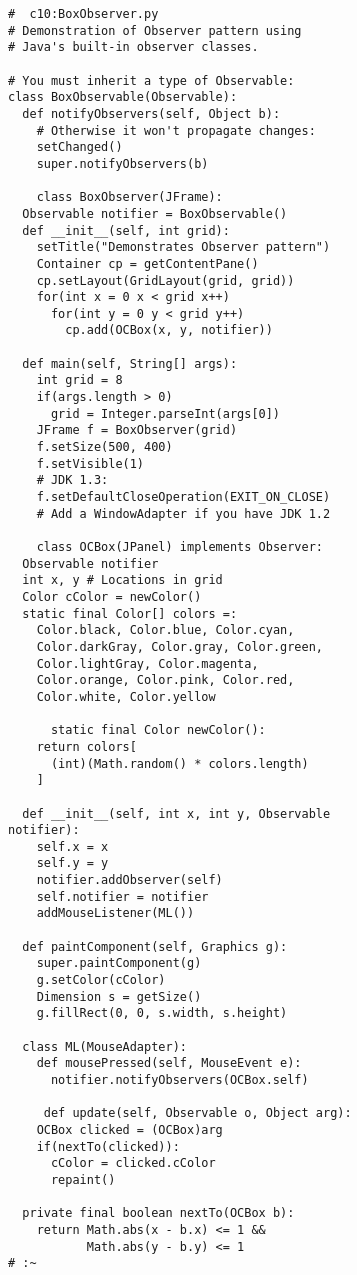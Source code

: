 \begin{lstlisting} 
#  c10:BoxObserver.py 
# Demonstration of Observer pattern using 
# Java's built-in observer classes. 

# You must inherit a type of Observable: 
class BoxObservable(Observable): 
  def notifyObservers(self, Object b): 
    # Otherwise it won't propagate changes: 
    setChanged() 
    super.notifyObservers(b) 
    
    class BoxObserver(JFrame): 
  Observable notifier = BoxObservable() 
  def __init__(self, int grid): 
    setTitle("Demonstrates Observer pattern") 
    Container cp = getContentPane() 
    cp.setLayout(GridLayout(grid, grid)) 
    for(int x = 0 x < grid x++) 
      for(int y = 0 y < grid y++) 
        cp.add(OCBox(x, y, notifier)) 
        
  def main(self, String[] args): 
    int grid = 8 
    if(args.length > 0) 
      grid = Integer.parseInt(args[0]) 
    JFrame f = BoxObserver(grid) 
    f.setSize(500, 400) 
    f.setVisible(1) 
    # JDK 1.3: 
    f.setDefaultCloseOperation(EXIT_ON_CLOSE) 
    # Add a WindowAdapter if you have JDK 1.2 
    
    class OCBox(JPanel) implements Observer: 
  Observable notifier 
  int x, y # Locations in grid 
  Color cColor = newColor() 
  static final Color[] colors =:  
    Color.black, Color.blue, Color.cyan,  
    Color.darkGray, Color.gray, Color.green, 
    Color.lightGray, Color.magenta,  
    Color.orange, Color.pink, Color.red,  
    Color.white, Color.yellow 
    
      static final Color newColor(): 
    return colors[ 
      (int)(Math.random() * colors.length) 
    ] 
    
  def __init__(self, int x, int y, Observable 
notifier): 
    self.x = x 
    self.y = y 
    notifier.addObserver(self) 
    self.notifier = notifier 
    addMouseListener(ML()) 
    
  def paintComponent(self, Graphics g): 
    super.paintComponent(g) 
    g.setColor(cColor) 
    Dimension s = getSize() 
    g.fillRect(0, 0, s.width, s.height) 
    
  class ML(MouseAdapter): 
    def mousePressed(self, MouseEvent e): 
      notifier.notifyObservers(OCBox.self) 
      
     def update(self, Observable o, Object arg): 
    OCBox clicked = (OCBox)arg 
    if(nextTo(clicked)): 
      cColor = clicked.cColor 
      repaint() 
      
  private final boolean nextTo(OCBox b): 
    return Math.abs(x - b.x) <= 1 &&  
           Math.abs(y - b.y) <= 1 
# :~   
\end{lstlisting}

